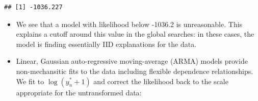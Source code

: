 \documentclass[]{article}
\newenvironment{Shaded}{\begin{snugshade}}{\end{snugshade}}
\newcommand{\KeywordTok}[1]{\textcolor[rgb]{0.13,0.29,0.53}{\textbf{#1}}}
\newcommand{\DataTypeTok}[1]{\textcolor[rgb]{0.13,0.29,0.53}{#1}}
\newcommand{\DecValTok}[1]{\textcolor[rgb]{0.00,0.00,0.81}{#1}}
\newcommand{\StringTok}[1]{\textcolor[rgb]{0.31,0.60,0.02}{#1}}
\newcommand{\OtherTok}[1]{\textcolor[rgb]{0.56,0.35,0.01}{#1}}
\newcommand{\ControlFlowTok}[1]{\textcolor[rgb]{0.13,0.29,0.53}{\textbf{#1}}}
\newcommand{\OperatorTok}[1]{\textcolor[rgb]{0.81,0.36,0.00}{\textbf{#1}}}
\newcommand{\NormalTok}[1]{#1}
\begin{document}
\begin{Shaded}
\end{Shaded}

\begin{verbatim}
## [1] -1036.227
\end{verbatim}

\begin{itemize}
\item
  We see that a model with likelihood below -1036.2 is unreasonable.
  This explains a cutoff around this value in the global searches: in
  these cases, the model is finding essentially IID explanations for the
  data.
\item
  Linear, Gaussian auto-regressive moving-average (ARMA) models provide
  non-mechansitic fits to the data including flexible dependence
  relationships. We fit to \(\log(y_n^*+1)\) and correct the likelihood
  back to the scale appropriate for the untransformed data:
\end{itemize}

\begin{Shaded}
\end{Shaded}
\end{document}
